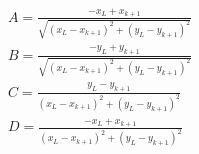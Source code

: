 \documentclass[twocolumn]{article}
\begin{document}


\begin{align*}
    A = \frac{- x_{L} + x_{k+1}}{\sqrt{\left(x_{L} - x_{k+1}\right)^{2} + \left(y_{L} - y_{k+1}\right)^{2}}} \\
    B = \frac{- y_{L} + y_{k+1}}{\sqrt{\left(x_{L} - x_{k+1}\right)^{2} + \left(y_{L} - y_{k+1}\right)^{2}}} \\
    C = \frac{y_{L} - y_{k+1}}{\left(x_{L} - x_{k+1}\right)^{2} + \left(y_{L} - y_{k+1}\right)^{2}} \\
    D = \frac{- x_{L} + x_{k+1}}{\left(x_{L} - x_{k+1}\right)^{2} + \left(y_{L} - y_{k+1}\right)^{2}}
\end{align*}
\end{document}
